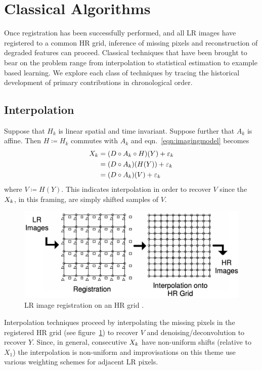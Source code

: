 \section{Classical Algorithms}\label{sec:classical-algorithms}
\localtableofcontents

Once registration has been successfully performed, and all LR images have registered to a common HR grid, inference of missing pixels and reconstruction of degraded features can proceed.
%
Classical techniques that have been brought to bear on the problem range from interpolation to statistical estimation to example based learning. We explore each class of techniques by tracing the historical development of primary contributions in chronological order.

\subsection{Interpolation}\label{subsec:interpolation}

Suppose that \(H_k\) is linear spatial and time invariant.
%
Suppose further that \(A_k\) is affine.
%
Then \(H \coloneqq H_k\) commutes with \(A_k\) \cite{meladcommute} and eqn.~\eqref{eqn:imagingmodel} becomes
\begin{equation}
    \label{eqn:commuteimagingmodel}
    \begin{split}
        X_k &= (D \circ A_k \circ H) (Y) + \varepsilon_k \\
        &= (D \circ A_k) (H(Y)) + \varepsilon_k \\
        &= (D \circ A_k) (V) + \varepsilon_k
    \end{split}
\end{equation}
%
where \(V \coloneqq H(Y)\).
%
This indicates interpolation in order to recover \(V\) since the \(X_k\), in this framing, are simply shifted samples of \(V\).
%
\begin{figure}[!htbp]
    \centering
    \includegraphics[width=\linewidth,keepaspectratio]{figures/classical/hrgrid.png}
    \caption{LR image registration on an HR grid \cite{Lin}.}
    \label{fig:hrgrid}
\end{figure}
Interpolation techniques proceed by interpolating the missing pixels in the registered HR grid (see figure~\ref{fig:hrgrid}) to recover \(V\) and denoising/deconvolution to recover \(Y\).
%
Since, in general, consecutive \(X_k\) have non-uniform shifts (relative to \(X_1\)) the interpolation is non-uniform and improvisations on this theme use various weighting schemes for adjacent LR pixels.

